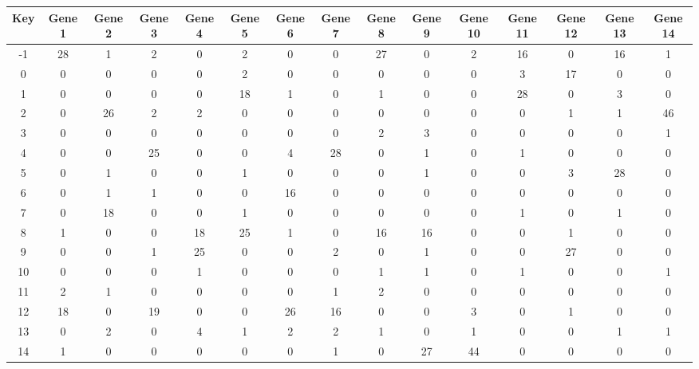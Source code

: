 \begin{tabular}{|c|c|c|c|c|c|c|c|c|c|c|c|c|c|c|}
\hline
Key & Gene 1 & Gene 2 & Gene 3 & Gene 4 & Gene 5 & Gene 6 & Gene 7 & Gene 8 & Gene 9 & Gene 10 & Gene 11 & Gene 12 & Gene 13 & Gene 14 \\
\hline
-1 & 28 & 1 & 2 & 0 & 2 & 0 & 0 & 27 & 0 & 2 & 16 & 0 & 16 & 1 \\
0 & 0 & 0 & 0 & 0 & 2 & 0 & 0 & 0 & 0 & 0 & 3 & 17 & 0 & 0 \\
1 & 0 & 0 & 0 & 0 & 18 & 1 & 0 & 1 & 0 & 0 & 28 & 0 & 3 & 0 \\
2 & 0 & 26 & 2 & 2 & 0 & 0 & 0 & 0 & 0 & 0 & 0 & 1 & 1 & 46 \\
3 & 0 & 0 & 0 & 0 & 0 & 0 & 0 & 2 & 3 & 0 & 0 & 0 & 0 & 1 \\
4 & 0 & 0 & 25 & 0 & 0 & 4 & 28 & 0 & 1 & 0 & 1 & 0 & 0 & 0 \\
5 & 0 & 1 & 0 & 0 & 1 & 0 & 0 & 0 & 1 & 0 & 0 & 3 & 28 & 0 \\
6 & 0 & 1 & 1 & 0 & 0 & 16 & 0 & 0 & 0 & 0 & 0 & 0 & 0 & 0 \\
7 & 0 & 18 & 0 & 0 & 1 & 0 & 0 & 0 & 0 & 0 & 1 & 0 & 1 & 0 \\
8 & 1 & 0 & 0 & 18 & 25 & 1 & 0 & 16 & 16 & 0 & 0 & 1 & 0 & 0 \\
9 & 0 & 0 & 1 & 25 & 0 & 0 & 2 & 0 & 1 & 0 & 0 & 27 & 0 & 0 \\
10 & 0 & 0 & 0 & 1 & 0 & 0 & 0 & 1 & 1 & 0 & 1 & 0 & 0 & 1 \\
11 & 2 & 1 & 0 & 0 & 0 & 0 & 1 & 2 & 0 & 0 & 0 & 0 & 0 & 0 \\
12 & 18 & 0 & 19 & 0 & 0 & 26 & 16 & 0 & 0 & 3 & 0 & 1 & 0 & 0 \\
13 & 0 & 2 & 0 & 4 & 1 & 2 & 2 & 1 & 0 & 1 & 0 & 0 & 1 & 1 \\
14 & 1 & 0 & 0 & 0 & 0 & 0 & 1 & 0 & 27 & 44 & 0 & 0 & 0 & 0 \\
\hline
\end{tabular}